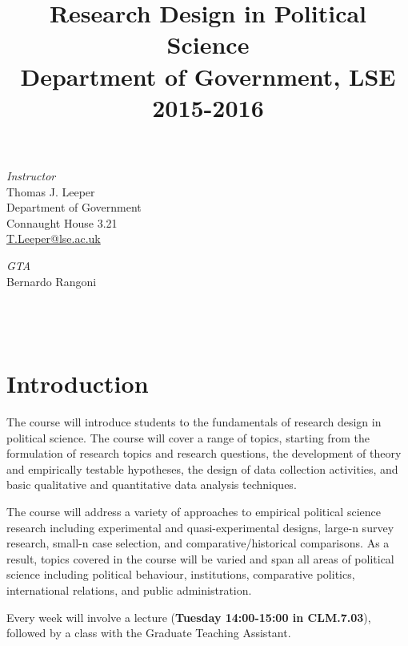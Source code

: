 \documentclass[12pt,a4paper]{article}
\title{\textbf{Research Design in Political Science}\\Department of Government, LSE\\2015-2016}
\author{}
\date{}
\begin{document}
\nobibliography*
\faketableofcontents

\maketitle

\vspace{-4em}

\begin{minipage}[b]{0.5\linewidth}
\textit{Instructor}\\
Thomas J. Leeper\\
Department of Government\\
Connaught House 3.21\\
\href{mailto:T.Leeper@lse.ac.uk}{T.Leeper@lse.ac.uk}\\
\end{minipage}
\begin{minipage}[b]{0.5\linewidth}
\textit{GTA}\\
Bernardo Rangoni\\
\hspace{1em}\\
\hspace{1em}\\
\hspace{1em}\\
\end{minipage}

\section{Introduction}
The course will introduce students to the fundamentals of research design in political science. The course will cover a range of topics, starting from the formulation of research topics and research questions, the development of theory and empirically testable hypotheses, the design of data collection activities, and basic qualitative and quantitative data analysis techniques. 

The course will address a variety of approaches to empirical political science research including experimental and quasi-experimental designs, large-n survey research, small-n case selection, and comparative/historical comparisons. As a result, topics covered in the course will be varied and span all areas of political science including political behaviour, institutions, comparative politics, international relations, and public administration.

Every week will involve a lecture (\textbf{Tuesday 14:00-15:00 in CLM.7.03}), followed by a class with the Graduate Teaching Assistant. 
\end{document}

